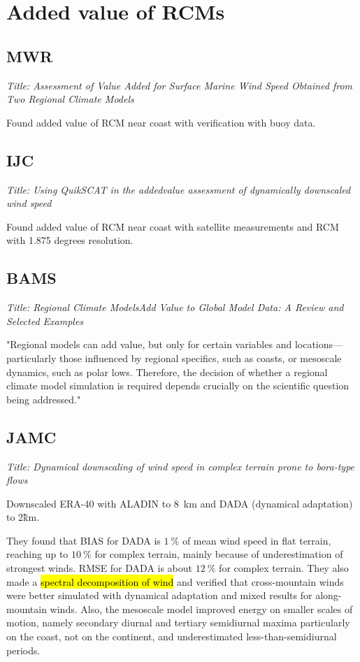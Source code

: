 \documentclass[12pt,a4paper]{article}
\begin{document}
\section{Added value of RCMs}

\subsection{\cite{Winterfeldt2009} MWR}

\textit{Title: Assessment of Value Added for Surface Marine Wind Speed Obtained from Two Regional Climate Models}

Found added value of RCM near coast with verification with buoy data.

\subsection{\cite{Winterfeldt2011} IJC }

\textit{Title: Using QuikSCAT in the addedvalue assessment of dynamically downscaled wind speed}

Found added value of RCM near coast with satellite measurements and RCM with 1.875 degrees resolution. 

\subsection{\cite{Feser2011RegionalExamples} BAMS}

\textit{Title: Regional Climate ModelsAdd Value to Global Model Data: A Review and Selected Examples}

"Regional models can add value, but only for certain variables and locations—particularly those influenced by regional specifics, such as coasts, or mesoscale dynamics, such as polar lows. Therefore, the decision of whether a regional climate model simulation is required depends crucially on the scientific question being addressed."

\subsection{\cite{Horvath2011} JAMC}

\textit{Title: Dynamical downscaling of wind speed in complex terrain prone to bora-type flows}

Downscaled ERA-40 with ALADIN to 8~km and DADA (dynamical adaptation) to 2\~km. 

They found that BIAS for DADA is $1~\%$ of mean wind speed in flat terrain, reaching up to $10~\%$ for complex terrain, mainly because of underestimation of strongest winds. RMSE for DADA is about $12~\%$ for complex terrain. They also made a \hl{spectral decomposition of wind} and verified that cross-mountain winds were better simulated with dynamical adaptation and mixed results for along-mountain winds. Also, the mesoscale model improved energy on smaller scales of motion, namely secondary diurnal and tertiary semidiurnal maxima particularly on the coast, not on the continent, and underestimated less-than-semidiurnal periods.
\end{document}

